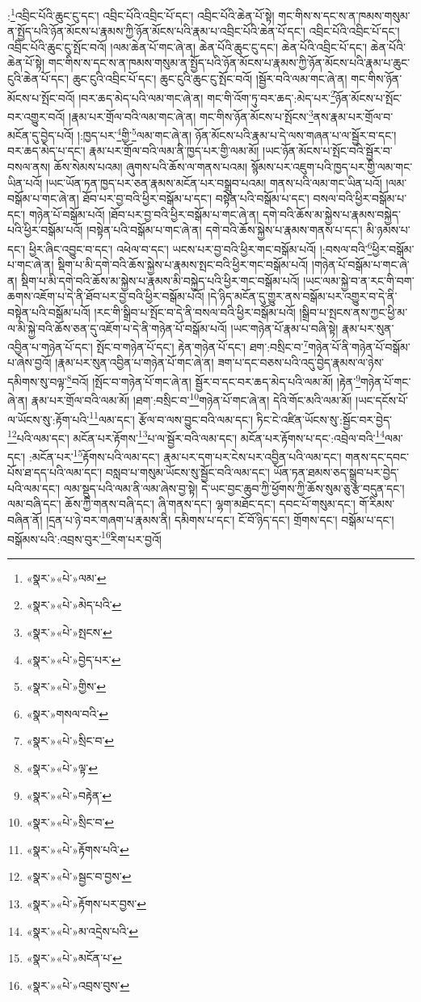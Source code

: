 :\footnote{«སྣར་»«པེ་»ལམ་}འབྲིང་པོའི་ཆུང་ངུ་དང་། འབྲིང་པོའི་འབྲིང་པོ་དང་། འབྲིང་པོའི་ཆེན་པོ་སྟེ། གང་གིས་ས་དང་ས་ན་ཁམས་གསུམ་ན་སྤྱོད་པའི་ཉོན་མོངས་པ་རྣམས་ཀྱི་ཉོན་མོངས་པའི་རྣམ་པ་འབྲིང་པོའི་ཆེན་པོ་དང་། འབྲིང་པོའི་འབྲིང་པོ་དང་། འབྲིང་པོའི་ཆུང་ངུ་སྤོང་བའོ། །ལམ་ཆེན་པོ་གང་ཞེ་ན། ཆེན་པོའི་ཆུང་ངུ་དང་། ཆེན་པོའི་འབྲིང་པོ་དང་། ཆེན་པོའི་ཆེན་པོ་སྟེ། གང་གིས་ས་དང་ས་ན་ཁམས་གསུམ་ན་སྤྱོད་པའི་ཉོན་མོངས་པ་རྣམས་ཀྱི་ཉོན་མོངས་པའི་རྣམ་པ་ཆུང་ངུའི་ཆེན་པོ་དང་། ཆུང་ངུའི་འབྲིང་པོ་དང་། ཆུང་ངུའི་ཆུང་ངུ་སྤོང་བའོ། །སྦྱོར་བའི་ལམ་གང་ཞེ་ན། གང་གིས་ཉོན་མོངས་པ་སྤོང་བའོ། །བར་ཆད་མེད་པའི་ལམ་གང་ཞེ་ན། གང་གི་འོག་ཏུ་བར་ཆད་:མེད་པར་\footnote{«སྣར་»«པེ་»མེད་པའི་}ཉོན་མོངས་པ་སྤོང་བར་འགྱུར་བའོ། །རྣམ་པར་གྲོལ་བའི་ལམ་གང་ཞེ་ན། གང་གིས་ཉོན་མོངས་པ་སྤོངས་\footnote{«སྣར་»«པེ་»སྤངས་}ནས་རྣམ་པར་གྲོལ་བ་མངོན་དུ་བྱེད་པའོ། །:ཁྱད་པར་\footnote{«སྣར་»«པེ་»བྱེད་པར་}གྱི་\footnote{«སྣར་»«པེ་»གྱིས་}ལམ་གང་ཞེ་ན། ཉོན་མོངས་པའི་རྣམ་པ་དེ་ལས་གཞན་པ་ལ་སྦྱོར་བ་དང་། བར་ཆད་མེད་པ་དང་། རྣམ་པར་གྲོལ་བའི་ལམ་ནི་ཁྱད་པར་གྱི་ལམ་མོ། །ཡང་ཉོན་མོངས་པ་སྤོང་བའི་སྦྱོར་བ་བསལ་ནས། ཆོས་སེམས་པའམ། ཞུགས་པའི་ཆོས་ལ་གནས་པའམ། སྙོམས་པར་འཇུག་པའི་ཁྱད་པར་གྱི་ལམ་གང་ཡིན་པའོ། །ཡང་ཡོན་ཏན་ཁྱད་པར་ཅན་རྣམས་མངོན་པར་བསྒྲུབ་པའམ། གནས་པའི་ལམ་གང་ཡིན་པའོ། །ལམ་བསྒོམ་པ་གང་ཞེ་ན། ཐོབ་པར་བྱ་བའི་ཕྱིར་བསྒོམ་པ་དང་། བསྟེན་པའི་བསྒོམ་པ་དང་། བསལ་བའི་ཕྱིར་བསྒོམ་པ་དང་། གཉེན་པོ་བསྒོམ་པའོ། །ཐོབ་པར་བྱ་བའི་ཕྱིར་བསྒོམ་པ་གང་ཞེ་ན། དགེ་བའི་ཆོས་མ་སྐྱེས་པ་རྣམས་བསྐྱེད་པའི་ཕྱིར་བསྒོམ་པའོ། །བསྟེན་པའི་བསྒོམ་པ་གང་ཞེ་ན། དགེ་བའི་ཆོས་སྐྱེས་པ་རྣམས་གནས་པ་དང་། མི་ཉམས་པ་དང་། ཕྱིར་ཞིང་འབྱུང་བ་དང་། འཕེལ་བ་དང་། ཡངས་པར་བྱ་བའི་ཕྱིར་གང་བསྒོམ་པའོ། །:བསལ་བའི་\footnote{«སྣར་»གསལ་བའི་}ཕྱིར་བསྒོམ་པ་གང་ཞེ་ན། སྡིག་པ་མི་དགེ་བའི་ཆོས་སྐྱེས་པ་རྣམས་སྤང་བའི་ཕྱིར་གང་བསྒོམ་པའོ། །གཉེན་པོ་བསྒོམ་པ་གང་ཞེ་ན། སྡིག་པ་མི་དགེ་བའི་ཆོས་མ་སྐྱེས་པ་རྣམས་མི་བསྐྱེད་པའི་ཕྱིར་གང་བསྒོམ་པའོ། །ཡང་ལམ་སྐྱེ་བ་ན་རང་གི་བག་ཆགས་འཇོག་པ་དེ་ནི་ཐོབ་པར་བྱ་བའི་ཕྱིར་བསྒོམ་པའོ། །དེ་ཉིད་མངོན་དུ་གྱུར་ནས་བསྒོམ་པར་འགྱུར་བ་དེ་ནི་བསྟེན་པའི་བསྒོམ་པའོ། །རང་གི་སྒྲིབ་པ་སྤོང་བ་དེ་ནི་བསལ་བའི་ཕྱིར་བསྒོམ་པའོ། །སྒྲིབ་པ་སྤངས་ནས་ཀྱང་ཕྱི་མ་ལ་མི་སྐྱེ་བའི་ཆོས་ཅན་དུ་འཇོག་པ་དེ་ནི་གཉེན་པོ་བསྒོམ་པའོ། །ཡང་གཉེན་པོ་རྣམ་པ་བཞི་སྟེ། རྣམ་པར་སུན་འབྱིན་པ་གཉེན་པོ་དང་། སྤོང་བ་གཉེན་པོ་དང་། རྟེན་གཉེན་པོ་དང་། ཐག་:བསྲིང་བ་\footnote{«སྣར་»«པེ་»སྲིང་བ་}གཉེན་པོ་ནི་གཉེན་པོ་བསྒོམ་པ་ཞེས་བྱའོ། །རྣམ་པར་སུན་འབྱིན་པ་གཉེན་པོ་གང་ཞེ་ན། ཟག་པ་དང་བཅས་པའི་འདུ་བྱེད་རྣམས་ལ་ཉེས་དམིགས་སུ་བལྟ་\footnote{«སྣར་»«པེ་»ལྟ་}བའོ། །སྤོང་བ་གཉེན་པོ་གང་ཞེ་ན། སྦྱོར་བ་དང་བར་ཆད་མེད་པའི་ལམ་མོ། །རྟེན་\footnote{«སྣར་»«པེ་»བརྟེན་}གཉེན་པོ་གང་ཞེ་ན། རྣམ་པར་གྲོལ་བའི་ལམ་མོ། །ཐག་:བསྲིང་བ་\footnote{«སྣར་»«པེ་»སྲིང་བ་}གཉེན་པོ་གང་ཞེ་ན། དེའི་གོང་མའི་ལམ་མོ། །ཡང་དངོས་པོ་ལ་ཡོངས་སུ་:རྟོག་པའི་\footnote{«སྣར་»«པེ་»རྟོགས་པའི་}ལམ་དང་། རྩོལ་བ་ལས་བྱུང་བའི་ལམ་དང་། ཏིང་ངེ་འཛིན་ཡོངས་སུ་:སྦྱོང་བར་བྱེད་\footnote{«སྣར་»«པེ་»སྦྱང་བ་བྱས་}པའི་ལམ་དང་། མངོན་པར་རྟོགས་\footnote{«སྣར་»«པེ་»རྟོགས་པར་བྱས་}པ་ལ་སྦྱོར་བའི་ལམ་དང་། མངོན་པར་རྟོགས་པ་དང་:འབྲེལ་བའི་\footnote{«སྣར་»«པེ་»མ་འདྲེས་པའི་}ལམ་དང་། :མངོན་པར་\footnote{«སྣར་»«པེ་»མངོན་པ་}རྟོགས་པའི་ལམ་དང་། རྣམ་པར་དག་པར་ངེས་པར་འབྱིན་པའི་ལམ་དང་། གནས་དང་དབང་པོས་ཐ་དད་པའི་ལམ་དང་། བསླབ་པ་གསུམ་ཡོངས་སུ་སྦྱོང་བའི་ལམ་དང་། ཡོན་ཏན་ཐམས་ཅད་སྒྲུབ་པར་བྱེད་པའི་ལམ་དང་། ལམ་སྡུད་པའི་ལམ་ནི་ལམ་ཞེས་བྱ་སྟེ། དེ་ཡང་བྱང་ཆུབ་ཀྱི་ཕྱོགས་ཀྱི་ཆོས་སུམ་ཅུ་རྩ་བདུན་དང་། ལམ་བཞི་དང་། ཆོས་ཀྱི་གནས་བཞི་དང་། ཞི་གནས་དང་། ལྷག་མཐོང་དང་། དབང་པོ་གསུམ་དང་། གོ་རིམས་བཞིན་ནོ། །དྲན་པ་ཉེ་བར་གཞག་པ་རྣམས་ནི། དམིགས་པ་དང་། ངོ་བོ་ཉིད་དང་། གྲོགས་དང་། བསྒོམ་པ་དང་། བསྒོམས་པའི་:འབྲས་བུར་\footnote{«སྣར་»«པེ་»འབྲས་བུས་}རིག་པར་བྱའོ། 